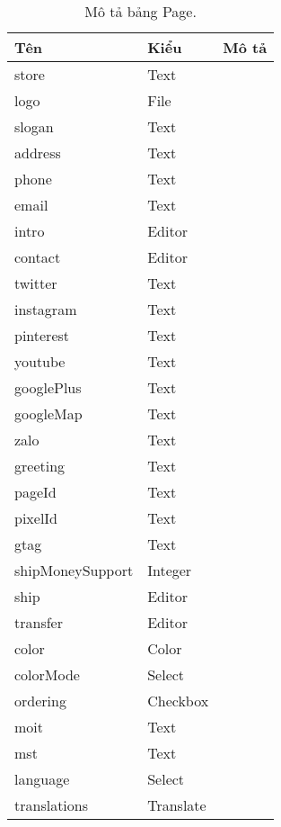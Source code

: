 \begin{table}[p]
	\begin{center}
		\begin{tabular}{ |l|l|l| } 
			\hline
			Tên & Kiểu & Mô tả \\
			\hline
			store & Text & \dotfill \\
			logo & File & \dotfill \\
			slogan & Text & \dotfill \\
			address & Text & \dotfill \\
			phone & Text & \dotfill \\
			email & Text & \dotfill \\
			intro & Editor & \dotfill \\
			contact & Editor & \dotfill \\
			twitter & Text & \dotfill \\
			instagram & Text & \dotfill \\
			pinterest & Text & \dotfill \\
			youtube & Text & \dotfill \\
			googlePlus & Text & \dotfill \\
			googleMap & Text & \dotfill \\
			zalo & Text & \dotfill \\
			greeting & Text & \dotfill \\
			pageId & Text & \dotfill \\
			pixelId & Text & \dotfill \\
			gtag & Text & \dotfill \\
			shipMoneySupport & Integer & \dotfill \\
			ship & Editor & \dotfill \\
			transfer & Editor & \dotfill \\
			color & Color & \dotfill \\
			colorMode & Select & \dotfill \\
			ordering & Checkbox & \dotfill \\
			moit & Text & \dotfill \\
			mst & Text & \dotfill \\
			language & Select & \dotfill \\
			translations & Translate & \dotfill \\ 
			\hline
		\end{tabular}
		\caption{Mô tả bảng Page.}
		\label{table:Page}
	\end{center}
\end{table}


